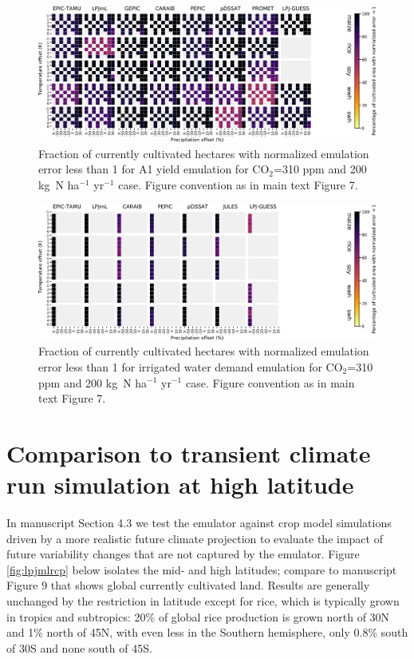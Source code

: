 \documentclass[12pt]{article}
\begin{document}
\begin{figure}[h!]
  \centering
  \includegraphics[width=15.5cm]{error_grid_360_cultivated_A1.png}
  \caption{
  Fraction of currently cultivated hectares with normalized emulation error less than 1 for A1 yield emulation for CO$_2$=310 ppm and 200 kg~N ha$^{-1}$ yr$^{-1}$ case. Figure convention as in main text Figure 7.
  }
  \label{fig:error810}
\end{figure}

\begin{figure}[h!]
  \centering
  \includegraphics[width=15.5cm]{error_grid_360_cultivated_IWD.png}
  \caption{
  Fraction of currently cultivated hectares with normalized emulation error less than 1 for irrigated water demand emulation for CO$_2$=310 ppm and 200 kg~N ha$^{-1}$ yr$^{-1}$ case. Figure convention as in main text Figure 7.
  }
  \label{fig:error810}
\end{figure}

\clearpage
\section{Comparison to transient climate run simulation at high latitude}
\begin{flushleft}
In manuscript Section 4.3 we test the emulator against crop model simulations driven by a more realistic future climate projection to evaluate the impact of future variability changes that are not captured by the emulator. 
	Figure \ref{fig:lpjmlrcp} below isolates the mid- and high latitudes; compare to manuscript Figure 9 that shows global currently cultivated land. 
	Results are generally unchanged by the restriction in latitude except for rice, which is typically grown in tropics and subtropics: 20\% of global rice production is grown north of 30N and 1\% north of 45N, with even less in the Southern hemisphere, only 0.8\%  south of 30S and none south of 45S.
\end{flushleft}
\end{document}
